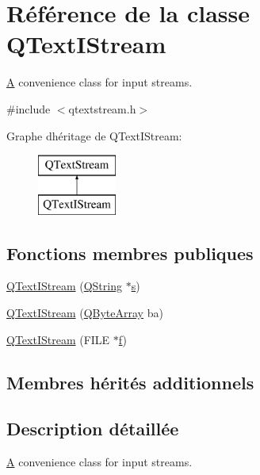 \hypertarget{class_q_text_i_stream}{}\section{Référence de la classe Q\+Text\+I\+Stream}
\label{class_q_text_i_stream}


\hyperlink{class_a}{A} convenience class for input streams.  




{\ttfamily \#include $<$qtextstream.\+h$>$}

Graphe d\textquotesingle{}héritage de Q\+Text\+I\+Stream\+:\begin{figure}[H]
\begin{center}
\leavevmode
\includegraphics[height=2.000000cm]{class_q_text_i_stream}
\end{center}
\end{figure}
\subsection*{Fonctions membres publiques}
\begin{DoxyCompactItemize}
\item 
\hyperlink{class_q_text_i_stream_ab28dbfb8b102119b18d71bb9676863e4}{Q\+Text\+I\+Stream} (\hyperlink{class_q_string}{Q\+String} $\ast$\hyperlink{060__command__switch_8tcl_a011c73f2dbb87635a3b4206c72355f6e}{s})
\item 
\hyperlink{class_q_text_i_stream_a4b612259aaacfd1d63d30f7a1f8f92dc}{Q\+Text\+I\+Stream} (\hyperlink{qcstring_8h_ad6a390648110655c217fe072d45fbcf5}{Q\+Byte\+Array} ba)
\item 
\hyperlink{class_q_text_i_stream_a1b287a75019206027b1d7fd7f175600e}{Q\+Text\+I\+Stream} (F\+I\+L\+E $\ast$\hyperlink{060__command__switch_8tcl_af6830d2c644b45088ea8f1f74a46b778}{f})
\end{DoxyCompactItemize}
\subsection*{Membres hérités additionnels}


\subsection{Description détaillée}
\hyperlink{class_a}{A} convenience class for input streams. 

